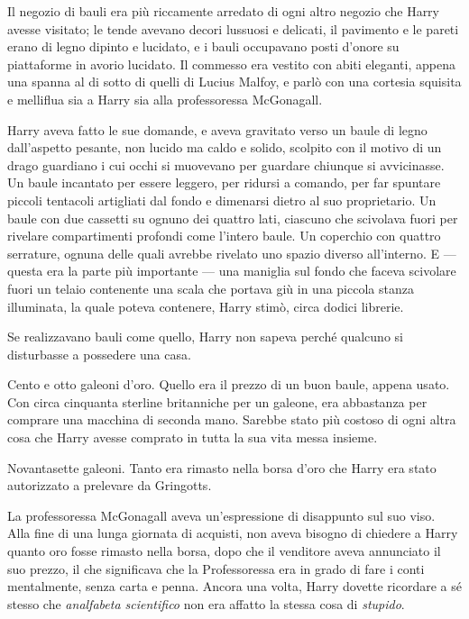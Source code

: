 Il negozio di bauli era più riccamente arredato di ogni altro negozio che Harry avesse visitato; le tende avevano decori lussuosi e delicati, il pavimento e le pareti erano di legno dipinto e lucidato, e i bauli occupavano posti d’onore su piattaforme in avorio lucidato. Il commesso era vestito con abiti eleganti, appena una spanna al di sotto di quelli di Lucius Malfoy, e parlò con una cortesia squisita e melliflua sia a Harry sia alla professoressa McGonagall.

Harry aveva fatto le sue domande, e aveva gravitato verso un baule di legno dall’aspetto pesante, non lucido ma caldo e solido, scolpito con il motivo di un drago guardiano i cui occhi si muovevano per guardare chiunque si avvicinasse. Un baule incantato per essere leggero, per ridursi a comando, per far spuntare piccoli tentacoli artigliati dal fondo e dimenarsi dietro al suo proprietario. Un baule con due cassetti su ognuno dei quattro lati, ciascuno che scivolava fuori per rivelare compartimenti profondi come l’intero baule. Un coperchio con quattro serrature, ognuna delle quali avrebbe rivelato uno spazio diverso all’interno. E — questa era la parte più importante — una maniglia sul fondo che faceva scivolare fuori un telaio contenente una scala che portava giù in una piccola stanza illuminata, la quale poteva contenere, Harry stimò, circa dodici librerie.

Se realizzavano bauli come quello, Harry non sapeva perché qualcuno si disturbasse a possedere una casa.

Cento e otto galeoni d’oro. Quello era il prezzo di un buon baule, appena usato. Con circa cinquanta sterline britanniche per un galeone, era abbastanza per comprare una macchina di seconda mano. Sarebbe stato più costoso di ogni altra cosa che Harry avesse comprato in tutta la sua vita messa insieme.

Novantasette galeoni. Tanto era rimasto nella borsa d’oro che Harry era stato autorizzato a prelevare da Gringotts.

La professoressa McGonagall aveva un’espressione di disappunto sul suo viso. Alla fine di una lunga giornata di acquisti, non aveva bisogno di chiedere a Harry quanto oro fosse rimasto nella borsa, dopo che il venditore aveva annunciato il suo prezzo, il che significava che la Professoressa era in grado di fare i conti mentalmente, senza carta e penna. Ancora una volta, Harry dovette ricordare a sé stesso che \textit{analfabeta scientifico} non era affatto la stessa cosa di \textit{stupido}.

